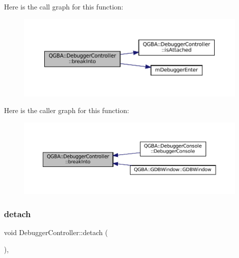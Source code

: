 Here is the call graph for this function\+:
\nopagebreak
\begin{figure}[H]
\begin{center}
\leavevmode
\includegraphics[width=350pt]{class_q_g_b_a_1_1_debugger_controller_ad2b19fb1fa3041f510d01f4a0d94e314_cgraph}
\end{center}
\end{figure}
Here is the caller graph for this function\+:
\nopagebreak
\begin{figure}[H]
\begin{center}
\leavevmode
\includegraphics[width=350pt]{class_q_g_b_a_1_1_debugger_controller_ad2b19fb1fa3041f510d01f4a0d94e314_icgraph}
\end{center}
\end{figure}
\mbox{\label{class_q_g_b_a_1_1_debugger_controller_a1154717cf3833d1d755687329d1fd093}} 
\subsubsection{\texorpdfstring{detach}{detach}}
{\footnotesize\ttfamily void Debugger\+Controller\+::detach (\begin{DoxyParamCaption}{ }\end{DoxyParamCaption})\hspace{0.3cm}{\ttfamily [virtual]}, {\ttfamily [slot]}}

